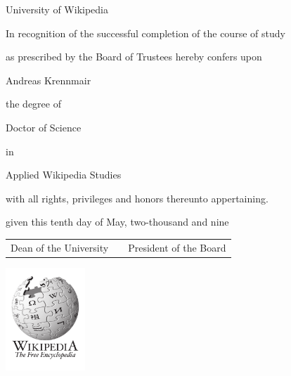 \documentclass[a4paper,12pt,landscape]{article}
\newcommand{\HEADER}{\fontsize{80}{80}}
\newcommand{\HUGE}{\fontsize{50}{80}}
\newcommand{\thefont}{\pgothfamily}
\begin{document}
\begin{center}
{\HEADER \thefont University of Wikipedia}

{\LARGE \thefont In recognition of the successful completion of the course of study}

{\LARGE \thefont as prescribed by the Board of Trustees hereby confers upon}

{\HUGE \thefont Andreas Krennmair}

{\LARGE \thefont the degree of}

{\HUGE \thefont Doctor of Science}

{\LARGE \thefont in}

{\HUGE \thefont Applied Wikipedia Studies}

{\LARGE \thefont with all rights, privileges and honors thereunto appertaining.}

{\LARGE \thefont given this tenth day of May, two-thousand and nine}

\end{center}

\vspace{1cm}
\begin{tabularx}{\textwidth}[b]{lXr} \cline{1-1} \cline{3-3}
{\large \thefont Dean of the University} & & {\large \thefont President of the Board}
\end{tabularx}

\begin{center}
\includegraphics[width=3cm,height=3.88cm]{wp-logo.pdf}
\end{center}
\end{document}

